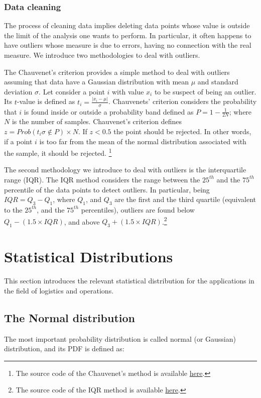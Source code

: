 \subsubsection{Data cleaning}
The process of cleaning data implies deleting data points whose value is outside the limit of the analysis one wants to perform. In particular, it often happens to have outliers whose measure is due to errors, having no connection with the real measure. We introduce two methodologies to deal with outliers.\par

The Chauvenet’s criterion provides a simple method to deal with outliers assuming that data have a Gaussian distribution with mean $\mu$ and standard deviation $\sigma$. Let consider a point $i$ with value $x_i$ to be suspect of being an outlier. Its $t$-value is defined as $t_i=\frac{|x_i-\mu|}{\sigma}$. Chauvenets’ criterion considers the probability that $i$ is found inside or outside a probability band defined as $P=1-\frac{1}{2N}$; where $N$ is the number of samples. Chauvenet’s criterion defines $z=Prob\left(t_i\sigma\notin P\right)\times N$. If $z<0.5$ the point should be rejected. In other words, if a point $i$ is too far from the mean of the normal distribution associated with the sample, it should be rejected. \footnote{The source code of the Chauvenet's method is available \href{https://github.com/aletuf93/logproj/blob/master/logproj/ml_dataCleaning.py}{here}.
} \par
The second methodology we introduce to deal with outliers is the interquartile range (IQR). The IQR method considers the range between the $25^{th}$ and the $75^{th}$ percentile of the data points to detect outliers. In particular, being $IQR = Q_3 - Q_1$, where $Q_1$, and $Q_3$ are the first and the third quartile (equivalent to the $25^{th}$, and the $75^{th}$ percentiles), outliers are found below $Q_1 - (1.5\times IQR)$, and above $Q_3 + (1.5\times IQR)$.\footnote{The source code of the IQR method is available \href{https://github.com/aletuf93/logproj/blob/master/logproj/ml_dataCleaning.py}{here}.
}


\section{Statistical Distributions}
This section introduces the relevant statistical distribution for the applications in the field of logistics and operations.

\subsection{The Normal distribution}
The most important probability distribution is called normal (or Gaussian) distribution, and its PDF is defined as:

